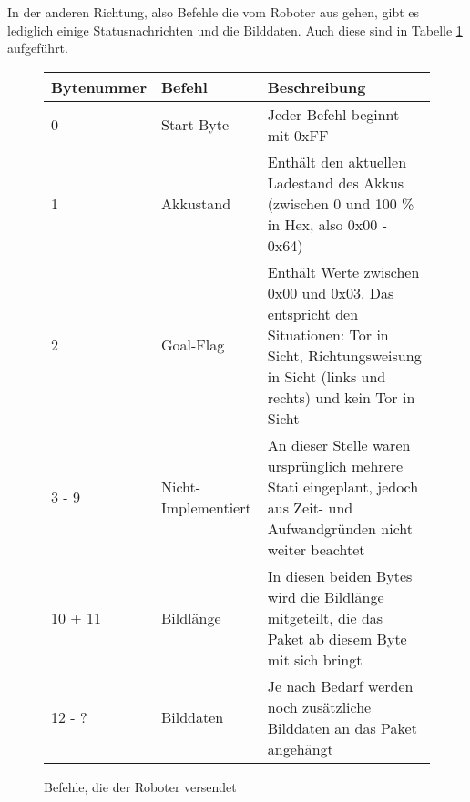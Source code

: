 In der anderen Richtung, also Befehle die vom Roboter aus gehen, gibt es lediglich einige Statusnachrichten und die Bilddaten. Auch diese sind in Tabelle \ref{tab:robot_to_serv} aufgeführt.



\begin{figure}[!h]
	\begin{tabular}{||p{}||p{}||p{}||}
		\hline Bytenummer & Befehl & Beschreibung \\ 
		\hline 0 & Start Byte &  Jeder Befehl beginnt mit 0xFF\\ 
		\hline 1 & Akkustand & Enthält den aktuellen Ladestand des Akkus (zwischen 0 und 100 \% in Hex, also 0x00 - 0x64) \\ 
		\hline 2 & Goal-Flag & Enthält Werte zwischen 0x00 und 0x03. Das entspricht den Situationen: Tor in Sicht, Richtungsweisung in Sicht (links und rechts) und kein Tor in Sicht \\ 
		\hline 3 - 9 & Nicht-Implementiert & An dieser Stelle waren ursprünglich mehrere Stati eingeplant, jedoch aus Zeit- und Aufwandgründen nicht weiter beachtet \\ 
		\hline 10 + 11 & Bildlänge & In diesen beiden Bytes wird die Bildlänge mitgeteilt, die das Paket ab diesem Byte mit sich bringt \\ 
		\hline 12 - ? & Bilddaten & Je nach Bedarf werden noch zusätzliche Bilddaten an das Paket angehängt \\
		\hline
	\end{tabular}  
	\caption{Befehle, die der Roboter versendet}
	\label{tab:robot_to_serv}
\end{figure}                         


